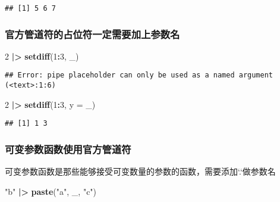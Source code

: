 \documentclass[
]{article}
\newenvironment{Shaded}{\begin{snugshade}}{\end{snugshade}}
\newcommand{\AttributeTok}[1]{\textcolor[rgb]{0.13,0.29,0.53}{#1}}
\newcommand{\DecValTok}[1]{\textcolor[rgb]{0.00,0.00,0.81}{#1}}
\newcommand{\FunctionTok}[1]{\textcolor[rgb]{0.13,0.29,0.53}{\textbf{#1}}}
\newcommand{\NormalTok}[1]{#1}
\newcommand{\SpecialCharTok}[1]{\textcolor[rgb]{0.81,0.36,0.00}{\textbf{#1}}}
\newcommand{\StringTok}[1]{\textcolor[rgb]{0.31,0.60,0.02}{#1}}
\begin{document}
\begin{verbatim}
## [1] 5 6 7
\end{verbatim}

\subsubsection{官方管道符的占位符一定需要加上参数名}\label{ux5b98ux65b9ux7ba1ux9053ux7b26ux7684ux5360ux4f4dux7b26ux4e00ux5b9aux9700ux8981ux52a0ux4e0aux53c2ux6570ux540d}

\begin{Shaded}
\begin{Highlighting}[]
\DecValTok{2} \SpecialCharTok{|\textgreater{}} \FunctionTok{setdiff}\NormalTok{(}\DecValTok{1}\SpecialCharTok{:}\DecValTok{3}\NormalTok{, \_)}
\end{Highlighting}
\end{Shaded}

\begin{verbatim}
## Error: pipe placeholder can only be used as a named argument (<text>:1:6)
\end{verbatim}

\begin{Shaded}
\begin{Highlighting}[]
\DecValTok{2} \SpecialCharTok{|\textgreater{}} \FunctionTok{setdiff}\NormalTok{(}\DecValTok{1}\SpecialCharTok{:}\DecValTok{3}\NormalTok{, }\AttributeTok{y =}\NormalTok{ \_)}
\end{Highlighting}
\end{Shaded}

\begin{verbatim}
## [1] 1 3
\end{verbatim}

\subsubsection{可变参数函数使用官方管道符}\label{ux53efux53d8ux53c2ux6570ux51fdux6570ux4f7fux7528ux5b98ux65b9ux7ba1ux9053ux7b26}

可变参数函数是那些能够接受可变数量的参数的函数，需要添加`.`做参数名

\begin{Shaded}
\begin{Highlighting}[]
\StringTok{"b"} \SpecialCharTok{|\textgreater{}}  \FunctionTok{paste}\NormalTok{(}\StringTok{"a"}\NormalTok{, \_, }\StringTok{"c"}\NormalTok{)}
\end{Highlighting}
\end{Shaded}
\end{document}
